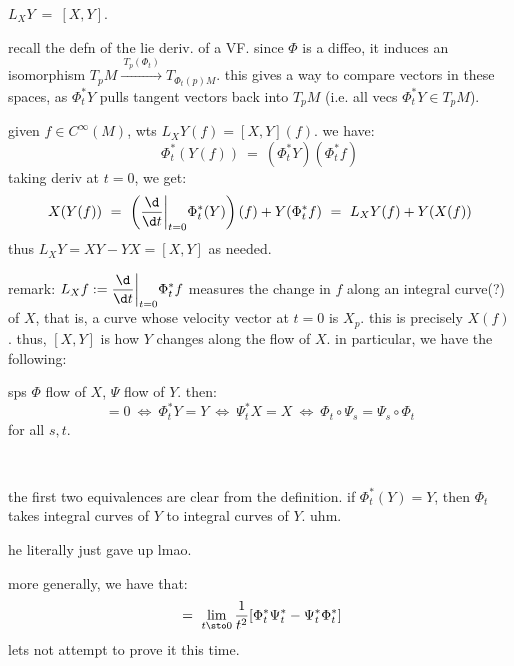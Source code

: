 \begin{thm}
	$L_{X}Y \ = \ [X,Y]$.
\end{thm}

recall the defn of the lie deriv. of a VF.
since $\Phi$ is a diffeo, it induces an isomorphism
$T_{p}M\xrightarrow{ \ T_{p}(\Phi_{t}) \ }T_{\Phi_{t}(p)M}$.
this gives a way to compare vectors in these spaces, as $\Phi_{t}^{*}Y$ pulls
tangent vectors back into $T_{p}M$ (i.e. all vecs $\Phi_{t}^{*}Y\in T_{p}M$).

\begin{pf}[]
	[of 8.10] given $f\in C^{\infty}(M)$, wts $L_{X}Y(f)=[X,Y](f)$. we have:
	\begin{equation*}
		\Phi_{t}^{*}(Y(f)) \ = \ (\Phi_{t}^{*}Y)(\Phi_{t}^{*}f)
	\end{equation*}
	taking deriv at $t=0$, we get:
	\begin{equation*}
		X(Y(f)) \ = \
		\left(\frac{\d}{\d t}\bigg\rvert_{t=0}\Phi_{t}^{*}(Y)\right)(f)
		+ Y(\Phi_{t}^{*}f)
		\ = \ L_{X}Y(f) + Y(X(f))
	\end{equation*}
	thus $L_{X}Y=XY-YX=[X,Y]$ as needed.
\end{pf}
remark: $L_{X}f:=\displaystyle\frac{\d}{\d t}\bigg\rvert_{t=0}\Phi_{t}^{*}f$
measures the change in $f$ along an integral curve(?) of $X$, that is,
a curve whose velocity vector at $t=0$ is $X_{p}$.
this is precisely $X(f)$.
thus, $[X,Y]$ is how $Y$ changes along the flow of $X$.
in particular, we have the following:

\begin{thm}
	sps $\Phi$ flow of $X$, $\Psi$ flow of $Y$. then:
	\begin{equation*}
		[X,Y]=0 \ \iff \ \Phi_{t}^{*}Y = Y \ \iff \ \Psi_{t}^{*}X = X
		\ \iff \ \Phi_{t}\circ\Psi_{s} = \Psi_{s}\circ\Phi_{t}
	\end{equation*}
	for all $s,t$.
\end{thm} \

\begin{pf}
	the first two equivalences are clear from the definition.
	if $\Phi_{t}^{*}(Y)=Y$, then $\Phi_{t}$ takes integral curves of $Y$ to
	integral curves of $Y$. uhm.
	
	he literally just gave up lmao.
\end{pf}
more generally, we have that:
\begin{equation*}
	[X,Y] \ = \ \lim_{t\sto0}\frac{1}{t^{2}}[\Phi_{t}^{*}\Psi_{t}^{*}-\Psi_{t}^{*}\Phi_{t}^{*}]
\end{equation*}
lets not attempt to prove it this time.

